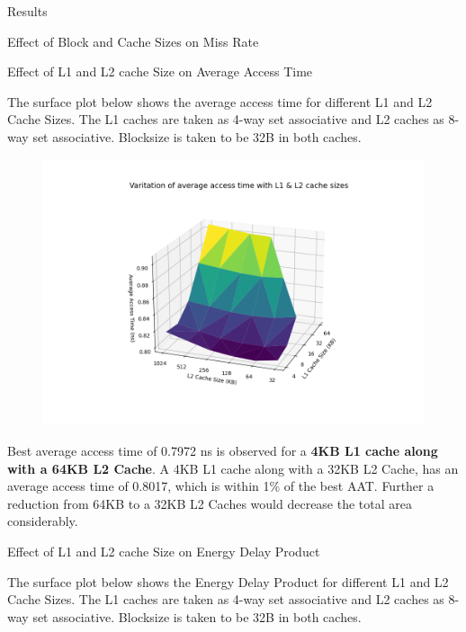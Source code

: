 \begin{section}{Results}
\begin{subsection}{Effect of Block and Cache Sizes on Miss Rate}
        
    \end{subsection}

   

    \begin{subsection}{Effect of L1 and L2 cache Size on Average Access Time}

    The surface plot below shows the average access time for different L1 and L2 Cache Sizes. The L1 caches are taken as 4-way set associative and L2 caches as 8-way set associative. Blocksize is taken to be 32B in both caches.

    \begin{figure}[h]
        \includegraphics[width=\textwidth]{figures/fig5/fig5.png}
        \centering
        \label{fig:fig5}
    \end{figure}

    Best average access time of 0.7972 ns is observed for a \textbf{4KB L1 cache along with a 64KB L2 Cache}. A 4KB L1 cache along with a 32KB L2 Cache, has an average access time of 0.8017, which is within 1\% of the best AAT. Further a reduction from 64KB to a 32KB L2 Caches would decrease the total area considerably.
    
    \end{subsection}

   
    \begin{subsection}{Effect of L1 and L2 cache Size on Energy Delay Product}

        The surface plot below shows the Energy Delay Product for different L1 and L2 Cache Sizes. The L1 caches are taken as 4-way set associative and L2 caches as 8-way set associative. Blocksize is taken to be 32B in both caches.
    

\end{subsection}
\end{section}
